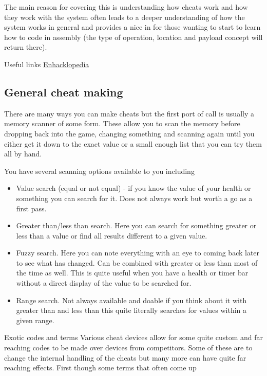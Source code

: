\documentclass[
]{book}
\providecommand{\tightlist}{%
  \setlength{\itemsep}{0pt}\setlength{\parskip}{0pt}}
\begin{document}
The main reason for covering this is understanding how cheats work and how they work with the system often leads to a deeper understanding of how the system works in general and provides a nice in for those wanting to start to learn how to code in assembly (the type of operation, location and payload concept will return there).

Useful links \href{http://bsfree.org/hack/}{Enhacklopedia}

\hypertarget{general-cheat-making}{%
\subsection{General cheat making}\label{general-cheat-making}}

There are many ways you can make cheats but the first port of call is usually a memory scanner of some form. These allow you to scan the memory before dropping back into the game, changing something and scanning again until you either get it down to the exact value or a small enough list that you can try them all by hand.

You have several scanning options available to you including

\begin{itemize}
\tightlist
\item
  Value search (equal or not equal) - if you know the value of your health or something you can search for it. Does not always work but worth a go as a first pass.
\item
  Greater than/less than search. Here you can search for something greater or less than a value or find all results different to a given value.
\item
  Fuzzy search. Here you can note everything with an eye to coming back later to see what has changed. Can be combined with greater or less than most of the time as well. This is quite useful when you have a health or timer bar without a direct display of the value to be searched for.
\item
  Range search. Not always available and doable if you think about it with greater than and less than this quite literally searches for values within a given range.
\end{itemize}

Exotic codes and terms Various cheat devices allow for some quite custom and far reaching codes to be made over devices from competitors. Some of these are to change the internal handling of the cheats but many more can have quite far reaching effects. First though some terms that often come up
\end{document}
